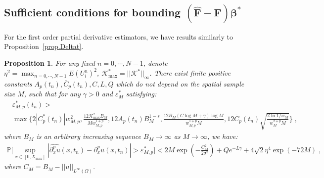 \documentclass[a4paper,11pt]{article}
\newcommand{\bbeta}{\bm{\beta}}
\newcommand{\bF}{\mathbf{F}}
\newtheorem{prop}{Proposition}[section]
\begin{document}
\subsection{Sufficient conditions for bounding $(\widehat{\bF}-\bF)\bbeta^*$}
For the first order partial derivative estimators, we have results similarly to Proposition~\ref{prop.Deltat}.
\begin{prop}\label{prop.Dx}
For any fixed $n=0,\cdots,N-1$, denote $\eta^2 = \max_{n=0,\cdots,N-1}E(U_i^n)^2$, $\mathcal{K}^*_{\max}=||\mathcal{K}^*||_\infty$. There exist finite positive constants $A_p(t_n),\overline{C}_p(t_n),C,L,Q$ which do not depend on the spatial sample size $M$, such that for any $\gamma>0$ and $\varepsilon_M^*$ satisfying:
\begin{align*}
&\varepsilon_{M,p}^*(t_n)>\\
&\max\{2|C_p^*(t_n)|w_{M,p}^2,\frac{12\mathcal{K}^*_{\max}B_M}{Mw_{M,p}^{1+p}},12A_p(t_n)B_M^{1-s},\frac{12B_M(C\log M+\gamma)\log M}{w_{M,p}^{1+p}M},12\overline{C}_p(t_n)\sqrt{\frac{2\ln1/w_M}{w_M^{2+p}M}}\}\;,	
\end{align*}
where $B_M$ is an arbitrary increasing sequence $B_M\to\infty$ as $M\to\infty$, we have:
\begin{align}
\mathbb{P}\Big[\sup_{x\in[0,X_{\max}]}|\widehat{\partial_x^pu}(x,t_n)-\partial_x^pu(x,t_n)|>\varepsilon_{M,p}^*\Big]<2M \exp(-\frac{C_M^2}{2\sigma^2})+Qe^{-L\gamma}+4\sqrt{2}\eta^4\exp(-72M)\;,
\end{align}
where $C_M = B_M-||u||_{L^\infty(\Omega)}$.
\end{prop}
\end{document}
